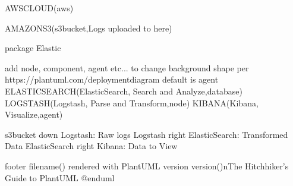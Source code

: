 \documentclass[letterpaper,10pt,english]{sphinxmanual}
\begin{document}
\begin{sphinxVerbatim}[commandchars=\\\{\},numbers=left,firstnumber=1,stepnumber=1]
AWSCLOUD(aws) \PYGZob{}

    AMAZONS3(s3\PYGZus{}bucket,\PYGZdq{}Logs uploaded to here\PYGZdq{})

package Elastic \PYGZob{}

    \PYGZsq{}add \PYGZdq{}node\PYGZdq{}, \PYGZdq{}component\PYGZdq{}, \PYGZdq{}agent\PYGZdq{} etc... to change background shape per https://plantuml.com/deployment\PYGZhy{}diagram
    \PYGZsq{}default is agent 
    ELASTIC\PYGZus{}SEARCH(ElasticSearch, \PYGZdq{}Search and Analyze\PYGZdq{},database)
    LOGSTASH(Logstash, \PYGZdq{}Parse and Transform\PYGZdq{},node)
    KIBANA(Kibana, \PYGZdq{}Visualize\PYGZdq{},agent) 
\PYGZcb{}

    s3\PYGZus{}bucket \PYGZhy{}down\PYGZhy{}\PYGZgt{} Logstash: Raw logs
    Logstash \PYGZhy{}right\PYGZhy{}\PYGZgt{} ElasticSearch: Transformed Data
    ElasticSearch \PYGZhy{}right\PYGZhy{}\PYGZgt{} Kibana: Data to View

\PYGZcb{}
footer \PYGZpc{}filename() rendered with PlantUML version \PYGZpc{}version()\PYGZbs{}nThe Hitchhiker’s Guide to PlantUML
@enduml
\end{sphinxVerbatim}
\end{document}
